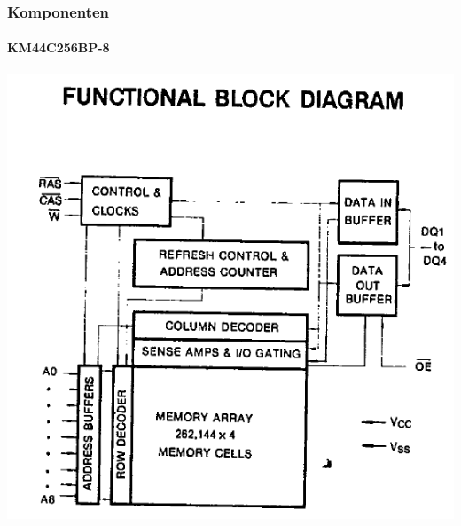 \documentclass{beamer}
\begin{document}
\begin{frame}

	\frametitle{Komponenten}
	\framesubtitle{KM44C256BP-8}
	\begin{center}
		\includegraphics[scale=0.35]{images/dram_peripherals.png}
	\end{center}
	
\end{frame}
\end{document}
